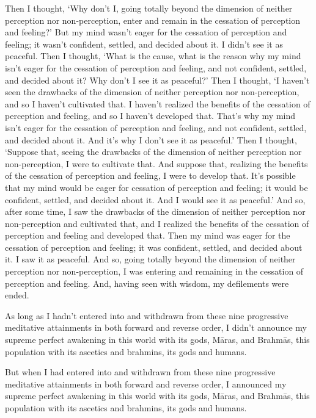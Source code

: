 \documentclass[12pt,openany]{book}%
\begin{document}
Then I thought, ‘Why don’t I, going totally beyond the dimension of neither perception nor non-perception, enter and remain in the cessation of perception and feeling?’ But my mind wasn’t eager for the cessation of perception and feeling; it wasn’t confident, settled, and decided about it. I didn’t see it as peaceful. Then I thought, ‘What is the cause, what is the reason why my mind isn’t eager for the cessation of perception and feeling, and not confident, settled, and decided about it? Why don’t I see it as peaceful?’ Then I thought, ‘I haven’t seen the drawbacks of the dimension of neither perception nor non-perception, and so I haven’t cultivated that. I haven’t realized the benefits of the cessation of perception and feeling, and so I haven’t developed that. That’s why my mind isn’t eager for the cessation of perception and feeling, and not confident, settled, and decided about it. And it’s why I don’t see it as peaceful.’ Then I thought, ‘Suppose that, seeing the drawbacks of the dimension of neither perception nor non-perception, I were to cultivate that. And suppose that, realizing the benefits of the cessation of perception and feeling, I were to develop that. It’s possible that my mind would be eager for cessation of perception and feeling; it would be confident, settled, and decided about it. And I would see it as peaceful.’ And so, after some time, I saw the drawbacks of the dimension of neither perception nor non-perception and cultivated that, and I realized the benefits of the cessation of perception and feeling and developed that. Then my mind was eager for the cessation of perception and feeling; it was confident, settled, and decided about it. I saw it as peaceful. And so, going totally beyond the dimension of neither perception nor non-perception, I was entering and remaining in the cessation of perception and feeling. And, having seen with wisdom, my defilements were ended. 

As long as I hadn’t entered into and withdrawn from these nine progressive meditative attainments in both forward and reverse order, I didn’t announce my supreme perfect awakening in this world with its gods, \textsanskrit{Māras}, and \textsanskrit{Brahmās}, this population with its ascetics and brahmins, its gods and humans. 

But when I had entered into and withdrawn from these nine progressive meditative attainments in both forward and reverse order, I announced my supreme perfect awakening in this world with its gods, \textsanskrit{Māras}, and \textsanskrit{Brahmās}, this population with its ascetics and brahmins, its gods and humans. 
\end{document}
